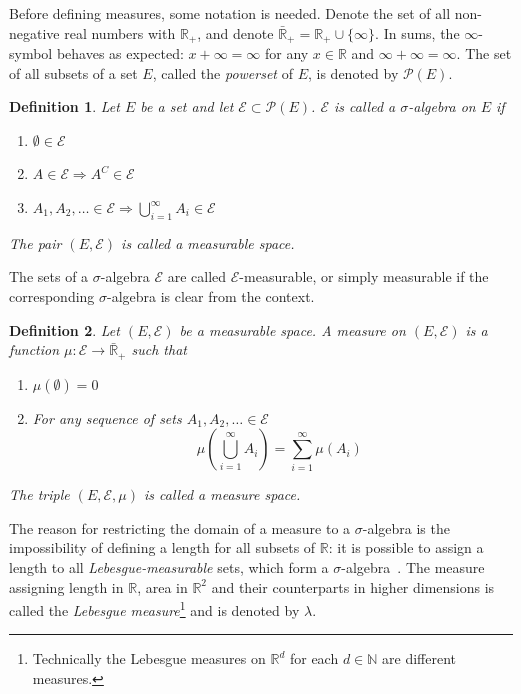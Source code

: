 \documentclass[english,twoside,openright]{HYgraduMLDS}
\newtheorem{definition}{Definition}
\newcommand{\R}{\mathbb{R}}
\newcommand{\N}{\mathbb{N}}
\begin{document}
Before defining measures, some notation is needed. Denote the set of all
non-negative real numbers with \(\R_{+}\), and denote
\(\bar{\R}_{+} = \R_{+}\cup \{\infty\}\). In sums, the \(\infty\)-symbol
behaves as expected: \(x + \infty = \infty\) for any \(x\in \R\) and
\(\infty + \infty = \infty\). The set of all subsets of a set \(E\), called
the \emph{powerset} of \(E\), is denoted by \(\mathcal{P}(E)\).

\begin{definition}
  Let \(E\) be a set and let \(\mathcal{E}\subset \mathcal{P}(E)\).
  \(\mathcal{E}\) is called a \(\sigma\)-algebra on \(E\) if
  \begin{enumerate}
    \item \(\emptyset \in \mathcal{E}\)
    \item \(A\in \mathcal{E}\Rightarrow A^{C}\in \mathcal{E}\)
    \item \(A_{1},A_{2},\dotsc \in \mathcal{E}
          \Rightarrow \bigcup_{i=1}^{\infty} A_{i}\in \mathcal{E}\)
  \end{enumerate}
  The pair \((E, \mathcal{E})\) is called a measurable space.
\end{definition}
The sets of a \(\sigma\)-algebra \(\mathcal{E}\) are called
\(\mathcal{E}\)-measurable, or simply measurable if the corresponding
\(\sigma\)-algebra is clear from the context.

\begin{definition}
	Let \((E, \mathcal{E})\) be a measurable space. A measure on \((E, \mathcal{E})\)
  is a function \(\mu\colon \mathcal{E}\to \bar{\R}_{+}\) such that
  \begin{enumerate}
    \item
    \(\mu(\emptyset) = 0\)
    \item
    For any sequence of sets \(A_{1}, A_{2},\dotsc \in \mathcal{E}\)
    \[
    \quad \mu\left(\bigcup_{i=1}^{\infty} A_{i}\right)
    = \sum_{i=1}^\infty\mu(A_{i})
    \]
  \end{enumerate}
  The triple \((E, \mathcal{E}, \mu)\) is called a measure space.
\end{definition}

The reason for restricting the domain of a measure to a \(\sigma\)-algebra
is the impossibility of defining a length for all subsets of \(\R\): it is
possible to assign a length to all \emph{Lebesgue-measurable} sets, which form
a \(\sigma\)-algebra~\cite{Cin11}. The measure assigning length in \(\R\),
area in \(\R^{2}\) and their counterparts in higher dimensions is called the
\emph{Lebesgue measure}\footnote{
  Technically the Lebesgue measures on \(\R^{d}\) for each \(d\in \N\) are
  different measures.
} and is denoted by \(\lambda\).
\end{document}
